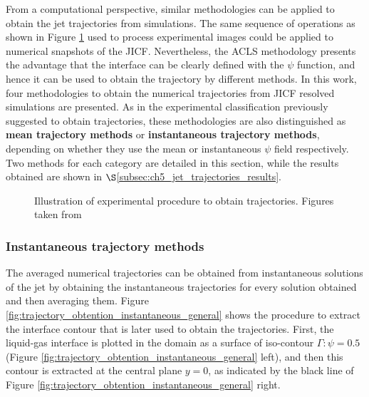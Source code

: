 From a computational perspective, similar methodologies can be applied to obtain the jet trajectories from simulations. The same sequence of operations as shown in Figure \ref{fig:expe_obtention_of_trajectories} used to process experimental images could be applied to numerical snapshots of the JICF. Nevertheless, the ACLS methodology presents the advantage that the interface can be clearly defined with the $\psi$ function, and hence it can be used to obtain the trajectory by different methods. In this work, four methodologies to obtain the numerical trajectories from JICF resolved simulations are presented. As in the experimental classification previously suggested to obtain trajectories, these methodologies are also distinguished as \textbf{mean trajectory methods} or \textbf{instantaneous trajectory methods}, depending on whether they use the mean or instantaneous $\psi$ field respectively. Two methods for each category are detailed in this section, while the results obtained are shown in $\S$\ref{subsec:ch5_jet_trajectories_results}.

\begin{figure}[ht]
     \centering
     \caption{Illustration of experimental procedure to obtain trajectories. Figures taken from }
      \label{fig:expe_obtention_of_trajectories}
\end{figure}


\subsubsection{Instantaneous trajectory methods}

The averaged numerical trajectories can be obtained from instantaneous solutions of the jet by obtaining the instantaneous trajectories for every solution obtained and then averaging them. Figure \ref{fig:trajectory_obtention_instantaneous_general} shows the procedure to extract the interface contour that is later used to obtain the trajectories. First, the liquid-gas interface is plotted in the domain as a surface of iso-contour $\Gamma: \psi = 0.5$ (Figure \ref{fig:trajectory_obtention_instantaneous_general} left), and then this contour is extracted at the central plane $y = 0$, as indicated by the black line of Figure \ref{fig:trajectory_obtention_instantaneous_general} right. 

